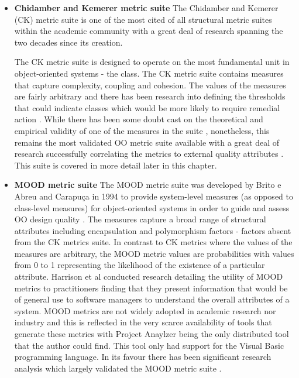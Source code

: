 \begin{itemize}
\item \textbf{Chidamber and Kemerer metric suite} The Chidamber and Kemerer (CK) metric suite is one of the most cited of all structural metric suites within the academic community \cite{pressman2005software} with a great deal of research spanning the two decades since its creation. 

The CK metric suite is designed to operate on the most fundamental unit in object-oriented systems - the class. The CK metric suite contains measures that capture complexity, coupling and cohesion. The values of the measures are fairly arbitrary and there has been research into defining the thresholds that could indicate classes which would be more likely to require remedial action \cite{rosenberg1998applying}. While there has been some doubt cast on the theoretical and empirical validity of one of the measures in the suite \cite{fenton2014software}, nonetheless, this remains the most validated OO metric suite available \cite{kitchenham2010s} with a great deal of research successfully correlating the metrics to external quality attributes \cite{rosenberg1998applying}\cite{el2001prediction} \cite{basili1984software}\cite{subramanyam2003empirical}. This suite is covered in more detail later in this chapter.

\item \textbf{MOOD metric suite} The MOOD metric suite was developed by Brito e Abreu and Carapu\c{c}a in 1994 to provide system-level measures (as opposed to class-level measures) for object-oriented systems in order to guide and assess OO design quality \cite{abreu1994object}. The measures capture a broad range of structural attributes including encapsulation and polymorphism factors - factors absent from the CK metrics suite. In contrast to CK metrics where the values of the measures are arbitrary, the MOOD metric values are probabilities with values from 0 to 1 representing the likelihood of the existence of a particular attribute. Harrison et al conducted research detailing the utility of MOOD metrics to practitioners \cite{harrison1998investigation} finding that they present information that would be of general use to software managers to understand the overall attributes of a system. MOOD metrics are not widely adopted in academic research nor industry and this is reflected in the very scarce availability of tools that generate these metrics with Project Anaylzer \cite{abounader1997data} being the only distributed tool that the author could find. This tool only had support for the Visual Basic programming language. In its favour there has been significant research analysis which largely validated the MOOD metric suite \cite{abounader1997data}\cite{harrison1998evaluation}.


\end{itemize}
